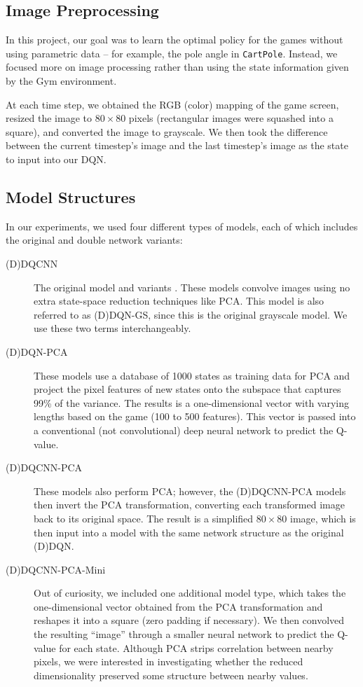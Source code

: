 \documentclass[11pt]{article}
\newcommand{\cp}{\texttt{CartPole}}
\begin{document}
\subsection{Image Preprocessing}

In this project, our goal was to learn the optimal policy for the games without using parametric data -- for example, the pole angle in \cp. Instead, we focused more on image processing rather than using the state information given by the Gym environment.

At each time step, we obtained the RGB (color) mapping of the game screen, resized the image to $80 \times 80$ pixels (rectangular images were squashed into a square), and converted the image to grayscale. We then took the difference between the current timestep's image and the last timestep's image as the state to input into our DQN. 

\subsection{Model Structures}
\label{subsec:model_structure}

In our experiments, we used four different types of models, each of which includes the original and double network variants: 

\begin{description}
    \item[(D)DQCNN] The original model \cite{mnih2013playing, mnih2015human} and variants \cite{van2016deep}. These models convolve images using no extra state-space reduction techniques like PCA. This model is also referred to as (D)DQN-GS, since this is the original grayscale model. We use these two terms interchangeably.
    
    \item[(D)DQN-PCA] These models use a database of 1000 states as training data for PCA and project the pixel features of new states onto the subspace that captures 99\% of the variance. The results is a one-dimensional vector with varying lengths based on the game (100 to 500 features). This vector is passed into a conventional (not convolutional) deep neural network to predict the Q-value.
    
    \item[(D)DQCNN-PCA] These models also perform PCA; however, the (D)DQCNN-PCA models then invert the PCA transformation, converting each transformed image back to its original space. The result is a simplified $80 \times 80$ image, which is then input into a model with the same network structure as the original (D)DQN.
    
    \item[(D)DQCNN-PCA-Mini] Out of curiosity, we included one additional model type, which takes the one-dimensional vector obtained from the PCA transformation and reshapes it into a square (zero padding if necessary). We then convolved the resulting ``image'' through a smaller neural network to predict the Q-value for each state. Although PCA strips correlation between nearby pixels, we were interested in investigating whether the reduced dimensionality preserved some structure between nearby values.
\end{description}
\end{document}
